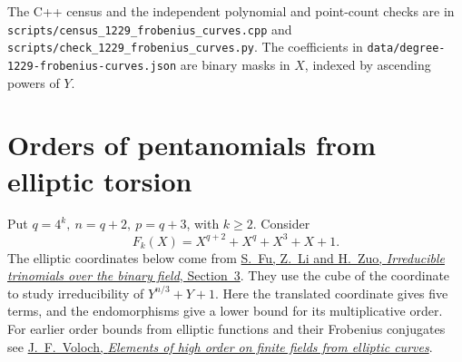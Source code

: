 \documentclass[11pt]{article}
\begin{document}
The C++ census and the independent polynomial and point-count checks
are in \nolinkurl{scripts/census_1229_frobenius_curves.cpp} and
\nolinkurl{scripts/check_1229_frobenius_curves.py}. The coefficients in
\nolinkurl{data/degree-1229-frobenius-curves.json} are binary masks in
\(X\), indexed by ascending powers of \(Y\).

\section{Orders of pentanomials from elliptic torsion}
\label{sec:elliptic-pentanomial-order}
Put \(q=4^k,\ n=q+2,\ p=q+3\), with \(k\ge2\). Consider
\[
      F_k(X)=X^{q+2}+X^q+X^3+X+1 .
\]
The elliptic coordinates below come from
\href{https://arxiv.org/abs/2611.34282}{S.~Fu, Z.~Li and H.~Zuo,
\emph{Irreducible trinomials over the binary field}, Section~3}.
They use the cube of the coordinate to study irreducibility of
\(Y^{n/3}+Y+1\). Here the translated coordinate gives five terms,
and the endomorphisms give a lower bound for its multiplicative
order. For earlier order bounds from elliptic functions and their
Frobenius conjugates see
\href{https://web.ma.utexas.edu/users/voloch/Preprints/ellfinprep.pdf}
{J.~F.~Voloch, \emph{Elements of high order on finite fields from
elliptic curves}}.
\end{document}
